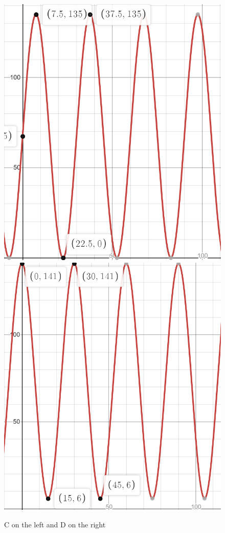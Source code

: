 \documentclass{ximera}
\begin{document}
\begin{exercise}
\begin{enumerate}
\begin{figure}[!h]
\begin{image}
\includegraphics[width=.4\linewidth]{ex2-c.png}
\hspace{20mm}
\includegraphics[width=.4\linewidth]{ex2-d.png}
\end{image}
\caption{C on the left and D on the right}
\end{figure}

\begin{multipleChoice}
\end{multipleChoice}
\end{enumerate}

\end{exercise}
\end{document}
